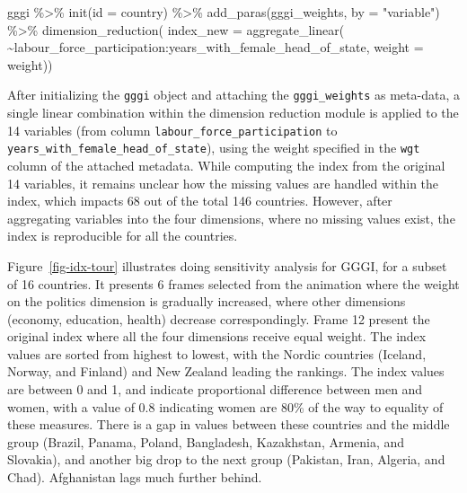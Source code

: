 \documentclass[
]{interact}
\newenvironment{Shaded}{\begin{snugshade}}{\end{snugshade}}
\newcommand{\AttributeTok}[1]{\textcolor[rgb]{0.40,0.45,0.13}{#1}}
\newcommand{\FunctionTok}[1]{\textcolor[rgb]{0.28,0.35,0.67}{#1}}
\newcommand{\NormalTok}[1]{\textcolor[rgb]{0.00,0.23,0.31}{#1}}
\newcommand{\SpecialCharTok}[1]{\textcolor[rgb]{0.37,0.37,0.37}{#1}}
\newcommand{\StringTok}[1]{\textcolor[rgb]{0.13,0.47,0.30}{#1}}
\begin{document}
\begin{Shaded}
\begin{Highlighting}[]
\NormalTok{gggi }\SpecialCharTok{\%\textgreater{}\%} 
  \FunctionTok{init}\NormalTok{(}\AttributeTok{id =}\NormalTok{ country) }\SpecialCharTok{\%\textgreater{}\%}
  \FunctionTok{add\_paras}\NormalTok{(gggi\_weights, }\AttributeTok{by =} \StringTok{"variable"}\NormalTok{) }\SpecialCharTok{\%\textgreater{}\%} 
  \FunctionTok{dimension\_reduction}\NormalTok{(}
    \AttributeTok{index\_new =} \FunctionTok{aggregate\_linear}\NormalTok{(}
      \SpecialCharTok{\textasciitilde{}}\NormalTok{labour\_force\_participation}\SpecialCharTok{:}\NormalTok{years\_with\_female\_head\_of\_state,}
      \AttributeTok{weight =}\NormalTok{ weight)) }
\end{Highlighting}
\end{Shaded}

After initializing the \texttt{gggi} object and attaching the
\texttt{gggi\_weights} as meta-data, a single linear combination within
the dimension reduction module is applied to the 14 variables (from
column \texttt{labour\_force\_participation} to
\texttt{years\_with\_female\_head\_of\_state}), using the weight
specified in the \texttt{wgt} column of the attached metadata. While
computing the index from the original 14 variables, it remains unclear
how the missing values are handled within the index, which impacts 68
out of the total 146 countries. However, after aggregating variables
into the four dimensions, where no missing values exist, the index is
reproducible for all the countries.

Figure~\ref{fig-idx-tour} illustrates doing sensitivity analysis for
GGGI, for a subset of 16 countries. It presents 6 frames selected from
the animation where the weight on the politics dimension is gradually
increased, where other dimensions (economy, education, health) decrease
correspondingly. Frame 12 present the original index where all the four
dimensions receive equal weight. The index values are sorted from
highest to lowest, with the Nordic countries (Iceland, Norway, and
Finland) and New Zealand leading the rankings. The index values are
between 0 and 1, and indicate proportional difference between men and
women, with a value of 0.8 indicating women are 80\% of the way to
equality of these measures. There is a gap in values between these
countries and the middle group (Brazil, Panama, Poland, Bangladesh,
Kazakhstan, Armenia, and Slovakia), and another big drop to the next
group (Pakistan, Iran, Algeria, and Chad). Afghanistan lags much further
behind.
\end{document}
